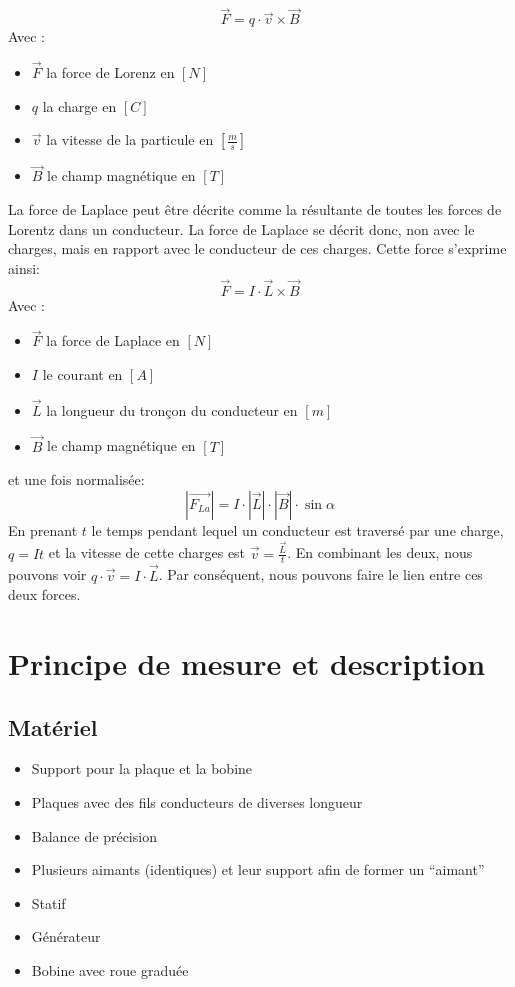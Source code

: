 \documentclass[11pt]{article}
\begin{document}
    \[\vec{F}=q\cdot\vec{v}\times\vec{B}\]
    Avec :
    \begin{itemize}
        \item $\vec{F}$ la force de Lorenz en $[N]$
        \item $q$ la charge en $[C]$
        \item $\vec{v}$ la vitesse de la particule en $[\frac{m}{s}]$
        \item $\vec{B}$ le champ magnétique en $[T]$
    \end{itemize}
    La force de Laplace peut être décrite comme la résultante de toutes les forces de Lorentz dans un
    conducteur.
    La force de Laplace se décrit donc, non avec le charges, mais en rapport avec le conducteur de ces
    charges.
    Cette force s'exprime ainsi:
    \[\vec{F}=I\cdot\vec{L}\times\vec{B}\]
    Avec :
    \begin{itemize}
        \item $\vec{F}$ la force de Laplace en $[N]$
        \item $I$ le courant en $[A]$
        \item $\vec{L}$ la longueur du tronçon du conducteur en $[m]$
        \item $\vec{B}$ le champ magnétique en $[T]$
    \end{itemize}
    et une fois normalisée:
    \[|\vec{F_{La}}|=I\cdot|\vec{L}|\cdot|\vec{B}|\cdot\sin\alpha\]
    En prenant $t$ le temps pendant lequel un conducteur est traversé par une charge, $q=It$ et la vitesse
    de cette charges est $\vec{v}=\frac{\vec{L}}{t}$.
    En combinant les deux, nous pouvons voir $q\cdot\vec{v}=I\cdot\vec{L}$.
    Par conséquent, nous pouvons faire le lien entre ces deux forces.

    \section{Principe de mesure et description}\label{sec:principe-de-mesure-et-description}

    \subsection{Matériel}\label{subsec:materiel}

    \begin{itemize}
        \item Support pour la plaque et la bobine
        \item Plaques avec des fils conducteurs de diverses longueur
        \item Balance de précision
        \item Plusieurs aimants (identiques) et leur support afin de former un ``aimant''
        \item Statif
        \item Générateur
        \item Bobine avec roue graduée
    \end{itemize}
\end{document}
